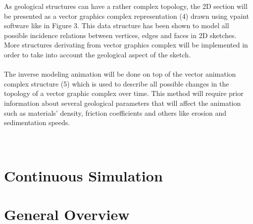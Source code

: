 \documentclass[12pt, a4paper]{memoir} %
\begin{document}
As geological structures can have a rather complex topology, the 2D section will be presented as a vector graphics complex representation (4) drawn using vpaint software like in Figure 3. This data structure has been shown to model all possible incidence relations between vertices, edges and faces in 2D sketches. More structures derivating from vector graphics complex will be implemented in order to take into account the geological aspect of the sketch.\\\\

The inverse modeling animation will be done on top of the vector animation complex structure (5) which is used to describe all possible changes in the topology of a vector graphic complex over time. This method will require prior information about several geological parameters that will affect the animation such as materials’ density, friction coefficients and others like erosion and sedimentation speeds.\\\\\

\section{Continuous Simulation}

\section{General Overview}
\end{document}
